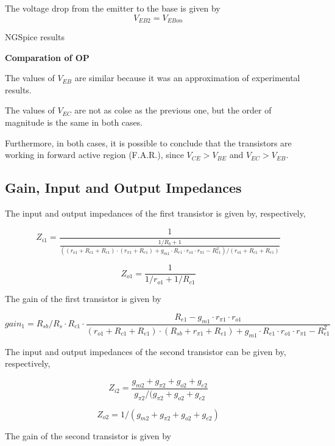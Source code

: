The voltage drop from the emitter to the base is given by $$ V_{EB2} = V_{EBon} $$


NGSpice results

\vspace{1cm}

\textbf{Comparation of OP} 

\indent

The values of $V_{EB}$ are similar because it was an approximation of experimental results.

The values of $V_{EC}$ are not as colse as the previous one, but the order of magnitude is the same in both cases.

Furthermore, in both cases, it is possible to conclude that the transistors are working in forward active region (F.A.R.), since $V_{CE} > V_{BE}$ and $V_{EC} > V_{EB}$.





\indent



\subsection{Gain, Input and Output Impedances}

The input and output impedances of the first transistor is given by, respectively,

$$Z_{i1} = \frac {1}{\frac {1/R_b+1}{((r_{o1}+R_{c1}+R_{e1})\cdot (r_{\pi 1}+R_{e1})+g_{m1}\cdot R_{e1}\cdot r_{o1}\cdot r_{\pi 1} - R_{e1}^2)/(r_{o1}+R_{c1}+R_{e1})}}$$

$$Z_{o1} = \frac {1}{1/r_{o1}+1/R_{c1}}$$

The gain of the first transistor is given by

$$gain_1=R_{sb}/R_{s}\cdot R_{c1}\cdot \frac {R_{e1}-g_{m1}\cdot r_{\pi 1}\cdot r_{o1}}{(r_{o1}+R_{c1}+R_{e1})\cdot (R_{sb}+r_{\pi 1}+R_{e1})+g_{m1}\cdot R_{e1}\cdot r_{o1}\cdot r_{\pi 1} - R_{e1}^2} $$

The input and output impedances of the second transistor can be given by, respectively,

$$Z_{i2} = \frac {g_{m2}+g_{\pi 2}+g_{o2}+g_{e2}}{g_{\pi 2}/(g_{\pi 2}+g_{o2}+g_{e2}}$$

$$Z_{o2} = 1/(g_{m2}+g_{\pi 2}+g_{o2}+g_{e2})$$

The gain of the second transistor is given by

